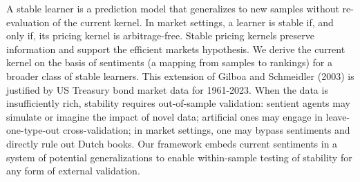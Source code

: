 %
%
%
%
%
  A stable learner is a prediction model that generalizes to new samples
  without re-evaluation of the current kernel.  In market settings, a learner
  is stable if, and only if, its pricing kernel is arbitrage-free.  Stable
  pricing kernels preserve information and support the efficient markets
  hypothesis. We derive the current kernel on the basis of sentiments (a
  mapping from samples to rankings) for a broader class of stable learners.
  This extension of Gilboa and Schmeidler (2003) is justified by US Treasury
  bond market data for 1961-2023.  When the data is insufficiently rich,
  stability requires out-of-sample validation: sentient agents may simulate or
  imagine the impact of novel data; artificial ones may engage in
  leave-one-type-out cross-validation; in market settings, one may bypass
  sentiments and directly rule out Dutch books. Our framework embeds current
  sentiments in a system of potential generalizations to enable within-sample
  testing of stability for any form of external validation.
%
%
%
